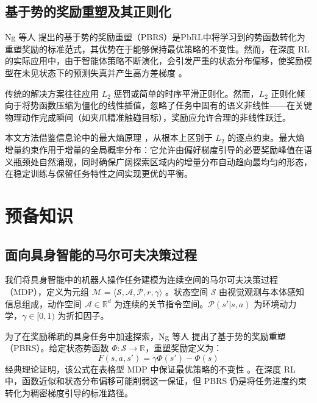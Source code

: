 \subsection{基于势的奖励重塑及其正则化}
\label{sec:pbrs_regularization}

Ng 等人 \cite{ng1999policy} 提出的基于势的奖励重塑（PBRS）是PbRL中将学习到的势函数转化为重塑奖励的标准范式，其优势在于能够保持最优策略的不变性。然而，在深度 RL 的实际应用中，由于智能体策略不断演化，会引发严重的状态分布偏移，使奖励模型在未见状态下的预测失真并产生高方差梯度 \cite{liang2022rune}。

传统的解决方案往往应用 $L_2$ 惩罚或简单的时序平滑正则化。然而，$L_2$ 正则化倾向于将势函数压缩为僵化的线性插值，忽略了任务中固有的语义非线性——在关键物理动作完成瞬间（如夹爪精准触碰目标），奖励应允许合理的非线性跃迁。

本文方法借鉴信息论中的最大熵原理 \cite{shannon1948, jaynes1957}，从根本上区别于 $L_2$ 的逐点约束。最大熵增量约束作用于增量的全局概率分布：它允许由偏好梯度引导的必要奖励峰值在语义瓶颈处自然涌现，同时确保广阔探索区域内的增量分布自动趋向最均匀的形态，在稳定训练与保留任务特性之间实现更优的平衡。

\section{预备知识}

\subsection{面向具身智能的马尔可夫决策过程}

我们将具身智能中的机器人操作任务建模为连续空间的马尔可夫决策过程（MDP），定义为元组 $\mathcal{M} = \langle \mathcal{S}, \mathcal{A}, \mathcal{P}, r, \gamma \rangle$ \cite{sutton2018}。状态空间 $\mathcal{S}$ 由视觉观测与本体感知信息组成，动作空间 $\mathcal{A} \in \mathbb{R}^d$ 为连续的关节指令空间。$\mathcal{P}(s'|s,a)$ 为环境动力学，$\gamma \in [0, 1)$ 为折扣因子。

为了在奖励稀疏的具身任务中加速探索，Ng 等人 \cite{ng1999policy} 提出了基于势的奖励重塑（PBRS）。给定状态势函数 $\Phi: \mathcal{S} \to \mathbb{R}$，重塑奖励定义为：
\begin{equation}
\label{eq:pbrs}
    F(s, a, s') = \gamma \Phi(s') - \Phi(s)
\end{equation}
经典理论证明，该公式在表格型 MDP 中保证最优策略的不变性 \cite{muller2025improving}。在深度 RL 中，函数近似和状态分布偏移可能削弱这一保证，但 PBRS 仍是将任务进度约束转化为稠密梯度引导的标准路径。

